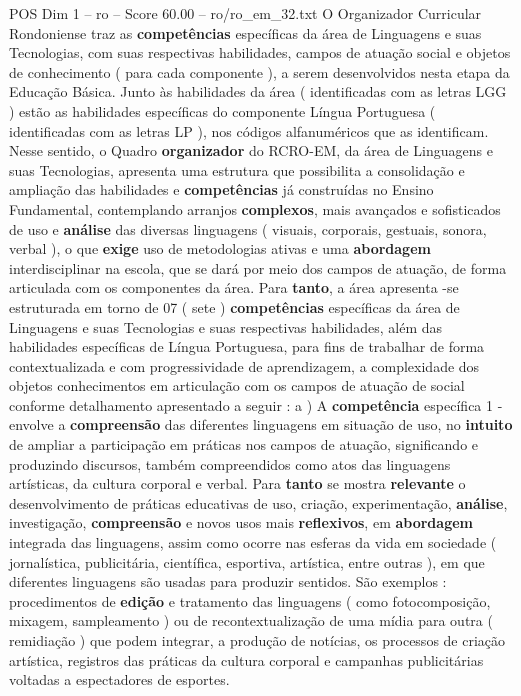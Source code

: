 \begin{textsample}{POS Dim 1 – ro – Score 60.00 – ro/ro\_em\_32.txt}
O Organizador Curricular Rondoniense traz as \textbf{competências} específicas da área de Linguagens e suas Tecnologias, com suas respectivas habilidades, campos de atuação social e objetos de conhecimento ( para cada componente ), a serem desenvolvidos nesta etapa da Educação Básica.
Junto às habilidades da área ( identificadas com as letras LGG ) estão as habilidades específicas do componente Língua Portuguesa ( identificadas com as letras LP ), nos códigos alfanuméricos que as identificam.
Nesse sentido, o Quadro \textbf{organizador} do RCRO-EM, da área de Linguagens e suas Tecnologias, apresenta uma estrutura que possibilita a consolidação e ampliação das habilidades e \textbf{competências} já construídas no Ensino Fundamental, contemplando arranjos \textbf{complexos}, mais avançados e sofisticados de uso e \textbf{análise} das diversas linguagens ( visuais, corporais, gestuais, sonora, verbal ), o que \textbf{exige} uso de metodologias ativas e uma \textbf{abordagem} interdisciplinar na escola, que se dará por meio dos campos de atuação, de forma articulada com os componentes da área.
Para \textbf{tanto}, a área apresenta -se estruturada em torno de 07 ( sete ) \textbf{competências} específicas da área de Linguagens e suas Tecnologias e suas respectivas habilidades, além das habilidades específicas de Língua Portuguesa, para fins de trabalhar de forma contextualizada e com progressividade de aprendizagem, a complexidade dos objetos conhecimentos em articulação com os campos de atuação de social conforme detalhamento apresentado a seguir : a ) A \textbf{competência} específica 1 - envolve a \textbf{compreensão} das diferentes linguagens em situação de uso, no \textbf{intuito} de ampliar a participação em práticas nos campos de atuação, significando e produzindo discursos, também compreendidos como atos das linguagens artísticas, da cultura corporal e verbal.
Para \textbf{tanto} se mostra \textbf{relevante} o desenvolvimento de práticas educativas de uso, criação, experimentação, \textbf{análise}, investigação, \textbf{compreensão} e novos usos mais \textbf{reflexivos}, em \textbf{abordagem} integrada das linguagens, assim como ocorre nas esferas da vida em sociedade ( jornalística, publicitária, científica, esportiva, artística, entre outras ), em que diferentes linguagens são usadas para produzir sentidos.
São exemplos : procedimentos de \textbf{edição} e tratamento das linguagens ( como fotocomposição, mixagem, sampleamento ) ou de recontextualização de uma mídia para outra ( remidiação ) que podem integrar, a produção de notícias, os processos de criação artística, registros das práticas da cultura corporal e campanhas publicitárias voltadas a espectadores de esportes.

\end{textsample}
